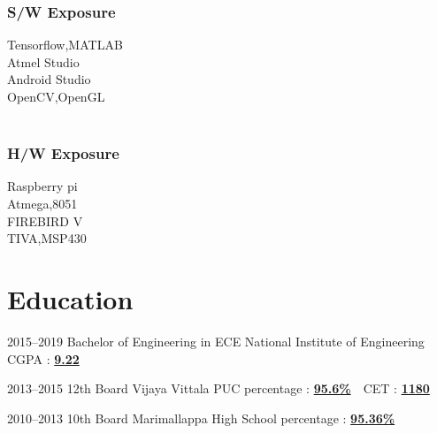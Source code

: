 \documentclass[print]{friggeri-cv} %
\begin{document}
{\subsubsection{S/W Exposure}
\vspace{3pt}
Tensorflow,MATLAB \\
Atmel Studio\\
Android Studio\\
OpenCV,OpenGL\\
~\\
\subsubsection{H/W Exposure}
\vspace{3pt}
Raspberry pi \\
Atmega,8051\\
FIREBIRD V\\
TIVA,MSP430\\
} 

 







\vspace{2cm}
\par\vspace{10pt}
\section{Education}

\begin{entrylist} 


\entry
{2015--2019}
{Bachelor of Engineering in ECE}
{National Institute of Engineering}
{CGPA : \textbf{\underline{9.22}}}



\entry
{2013--2015}  
{12th Board}
{Vijaya Vittala PUC}
{percentage : \textbf{\underline{95.6\%}} \,\,  CET : \textbf{\underline{1180}}} 


\entry
{2010--2013}  
{10th Board}
{Marimallappa High School}
{percentage : \textbf{\underline{95.36\%}}} 




\end{entrylist}
\end{document}
